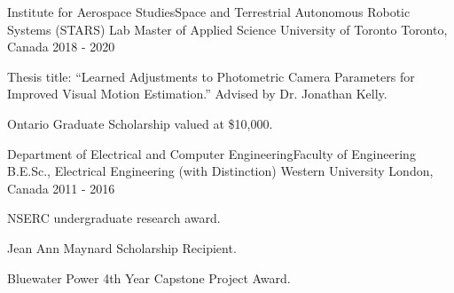 

\begin{cventries}

  \cventry
    {Institute for Aerospace Studies{\enskip\cdotp\enskip}Space and Terrestrial Autonomous Robotic Systems (STARS) Lab} %
    {Master of Applied Science {\enskip\cdotp\enskip}University of Toronto} %
    {Toronto, Canada} %
    {2018 - 2020} %
    {
      \begin{cvitems} %
        \item {Thesis title: ``Learned Adjustments to Photometric Camera Parameters for Improved Visual Motion Estimation.'' Advised by Dr. Jonathan Kelly.}
        \item {Ontario Graduate Scholarship valued at \$10,000.}
      \end{cvitems}
    }

  \cventry
    {Department of Electrical and Computer Engineering{\enskip\cdotp\enskip}Faculty of Engineering} %
    {B.E.Sc., Electrical Engineering (with Distinction) {\enskip\cdotp\enskip}Western University} %
    {London, Canada} %
    {2011 - 2016} %
    {
      \begin{cvitems} %
        \item {NSERC undergraduate research award.}
        \item {Jean Ann Maynard Scholarship Recipient.}
        \item {Bluewater Power 4th Year Capstone Project Award.}
      \end{cvitems}
    }

\end{cventries}
